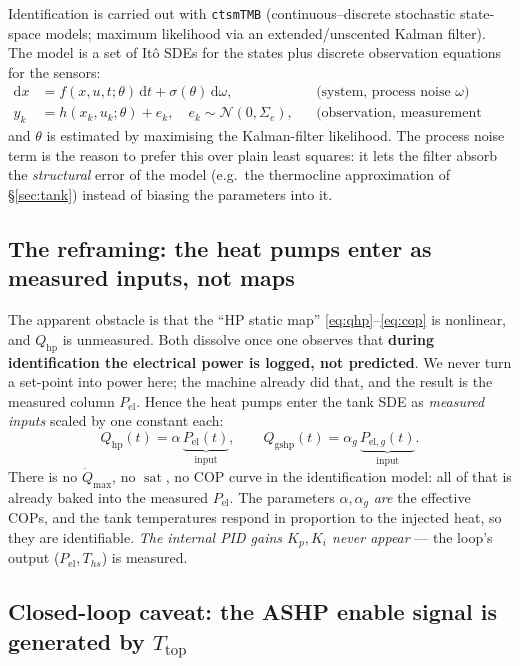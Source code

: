 \documentclass[11pt,a4paper]{article}
\DeclareMathOperator{\sat}{sat}
\newcommand{\Qmax}{\dot{Q}_{\max}}
\newcommand{\Ttop}{T_{\mathrm{top}}}
\newcommand{\Ths}{T_{hs}}          %
\newcommand{\Qhp}{Q_{\mathrm{hp}}}
\newcommand{\Pel}{P_{\mathrm{el}}}
\begin{document}
Identification is carried out with \texttt{ctsmTMB} (continuous--discrete
stochastic state-space models; maximum likelihood via an extended/unscented Kalman
filter). The model is a set of It\^o SDEs for the states plus discrete observation
equations for the sensors:
\begin{align}
  \mathrm d x &= f(x,u,t;\theta)\,\mathrm dt + \sigma(\theta)\,\mathrm d\omega,
  & &\text{(system, process noise $\omega$)} \label{eq:sde}\\
  y_k &= h(x_k,u_k;\theta) + e_k, \quad e_k\sim\mathcal N(0,\Sigma_e),
  & &\text{(observation, measurement noise)} \label{eq:obs}
\end{align}
and $\theta$ is estimated by maximising the Kalman-filter likelihood. The process
noise term is the reason to prefer this over plain least squares: it lets the
filter absorb the \emph{structural} error of the model (e.g.\ the thermocline
approximation of \S\ref{sec:tank}) instead of biasing the parameters into it.

\subsection{The reframing: the heat pumps enter as measured inputs, not maps}
The apparent obstacle is that the ``HP static map'' \eqref{eq:qhp}--\eqref{eq:cop}
is nonlinear, and $\Qhp$ is unmeasured. Both dissolve once one observes that
\textbf{during identification the electrical power is logged, not predicted}. We
never turn a set-point into power here; the machine already did that, and the
result is the measured column $\Pel$. Hence the heat pumps enter the tank SDE as
\emph{measured inputs} scaled by one constant each:
\begin{equation}
  \Qhp(t)=\alpha\,\underbrace{\Pel(t)}_{\text{input}}, \qquad
  Q_{\mathrm{gshp}}(t)=\alpha_g\,\underbrace{P_{\mathrm{el},g}(t)}_{\text{input}} .
  \label{eq:heat-inputs}
\end{equation}
There is no $\Qmax$, no $\sat$, no COP curve in the identification model: all of
that is already baked into the measured $\Pel$. The parameters $\alpha,\alpha_g$
\emph{are} the effective COPs, and the tank temperatures respond in proportion to
the injected heat, so they are identifiable. \emph{The internal PID gains
$K_p,K_i$ never appear} --- the loop's output ($\Pel,\Ths$) is measured.

\subsection{Closed-loop caveat: the ASHP enable signal is generated by \texorpdfstring{$\Ttop$}{Ttop}}
\label{sec:closedloop}
\end{document}

